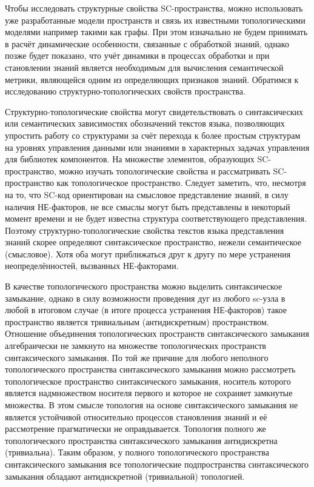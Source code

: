 Чтобы исследовать структурные свойства SC-пространства, можно использовать уже разработанные модели пространств и связь их известными топологическими моделями например такими как графы. При этом изначально не будем принимать в расчёт динамические особенности, связанные с обработкой знаний, однако позже будет показано, что учёт динамики в процессах обработки и при становлении знаний является необходимым для вычисления семантической метрики, являющейся одним из определяющих признаков знаний.
Обратимся к исследованию структурно-топологических свойств пространства.

Структурно-топологические свойства могут свидетельствовать о синтаксических или семантических зависимостях обозначений текстов языка, позволяющих упростить работу со структурами за счёт перехода к более простым структурам на уровнях управления данными или знаниями в характерных задачах управления для библиотек компонентов.
На множестве элементов, образующих SC-пространство, можно изучать топологические свойства и рассматривать SC-пространство как топологическое пространство. Следует заметить, что, несмотря на то, что SC-код ориентирован на смысловое представление знаний, в силу наличия НЕ-факторов, не все смыслы могут быть представлены в некоторый момент времени и не будет известна структура соответствующего представления. Поэтому структурно-топологические свойства текстов языка представления знаний скорее определяют синтаксическое пространство, нежели семантическое (смысловое). Хотя оба могут приближаться друг к другу по мере устранения неопределённостей, вызванных НЕ-факторами.

\begin{SCn}
\end{SCn}

В качестве топологического пространства можно выделить синтаксическое замыкание, однако в силу возможности проведения дуг из любого sc-узла в любой в итоговом случае (в итоге процесса устранения НЕ-факторов) такое пространство является тривиальным (антидискретным) пространством. Отношение объединения топологических пространств синтаксического замыкания алгебраически не замкнуто на множестве топологических пространств синтаксического замыкания. По той же причине для любого неполного топологического пространства синтаксического замыкания можно рассмотреть топологическое пространство синтаксического замыкания, носитель которого является надмножеством носителя первого и которое не сохраняет замкнутые множества. В этом смысле топология на основе синтаксического замыкания не является устойчивой относительно процессов становления знаний и её рассмотрение прагматически не оправдывается. Топология полного же топологического пространства синтаксического замыкания антидискретна (тривиальна). Таким образом, у полного топологического пространства синтаксического замыкания все топологические подпространства синтаксического замыкания обладают антидискретной (тривиальной) топологией.

